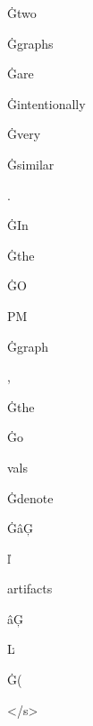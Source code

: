 \documentclass[varwidth]{standalone}
\begin{document}
\begin{CJK*}{UTF8}{gbsn}
{{{\colorbox{red!0.4272433}{\strut Ġtwo} \colorbox{red!0.28990138}{\strut Ġgraphs} \colorbox{red!1.5426795}{\strut Ġare} \colorbox{red!1.3360136}{\strut Ġintentionally} \colorbox{red!1.4172748}{\strut Ġvery} \colorbox{red!1.6613247}{\strut Ġsimilar} \colorbox{red!55.47182}{\strut .} \colorbox{red!0.47160488}{\strut ĠIn} \colorbox{red!0.46250647}{\strut Ġthe} \colorbox{red!0.18939003}{\strut ĠO} \colorbox{red!0.22861253}{\strut PM} \colorbox{red!0.0066794767}{\strut Ġgraph} \colorbox{red!0.97645235}{\strut ,} \colorbox{red!0.30408975}{\strut Ġthe} \colorbox{red!0.20206977}{\strut Ġo} \colorbox{red!0.3618452}{\strut vals} \colorbox{red!0.9324647}{\strut Ġdenote} \colorbox{red!0.54217273}{\strut ĠâĢ} \colorbox{red!2.5665786}{\strut ľ} \colorbox{red!0.752209}{\strut artifacts} \colorbox{red!1.4931289}{\strut âĢ} \colorbox{red!1.4340894}{\strut Ŀ} \colorbox{red!2.6985497}{\strut Ġ(} \colorbox{red!1.2800727}{\strut </s>} 
}}}
\end{CJK*}
\end{document}
